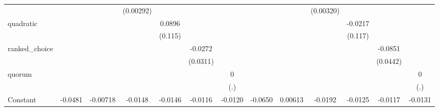 {\begin{tabular}{l*{12}{c}}
                    &                     &                     &   (0.00292)         &                     &                     &                     &                     &                     &   (0.00320)         &                     &                     &                     \\
quadratic           &                     &                     &                     &      0.0896         &                     &                     &                     &                     &                     &     -0.0217         &                     &                     \\
                    &                     &                     &                     &     (0.115)         &                     &                     &                     &                     &                     &     (0.117)         &                     &                     \\
ranked\_choice       &                     &                     &                     &                     &     -0.0272         &                     &                     &                     &                     &                     &     -0.0851\sym{*}  &                     \\
                    &                     &                     &                     &                     &    (0.0311)         &                     &                     &                     &                     &                     &    (0.0442)         &                     \\
quorum              &                     &                     &                     &                     &                     &           0         &                     &                     &                     &                     &                     &           0         \\
                    &                     &                     &                     &                     &                     &         (.)         &                     &                     &                     &                     &                     &         (.)         \\
Constant            &     -0.0481         &    -0.00718         &     -0.0148         &     -0.0146\sym{***}&     -0.0116\sym{***}&     -0.0120\sym{***}&     -0.0650         &     0.00613         &     -0.0192         &     -0.0125\sym{***}&     -0.0117\sym{***}&     -0.0131\sym{***}\\

\end{tabular}}
